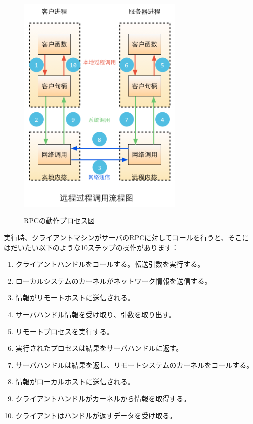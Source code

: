 \begin{figure}[H]
   \includegraphics[width=8cm]{8.4.rpc.png}
   \label{図8.8}
   \caption{RPCの動作プロセス図}
\end{figure}

実行時、クライアントマシンがサーバのRPCに対してコールを行うと、そこにはだいたい以下のような10ステップの操作があります：

\begin{enumerate}
  \item クライアントハンドルをコールする。転送引数を実行する。
  \item ローカルシステムのカーネルがネットワーク情報を送信する。
  \item 情報がリモートホストに送信される。
  \item サーバハンドル情報を受け取り、引数を取り出す。
  \item リモートプロセスを実行する。
  \item 実行されたプロセスは結果をサーバハンドルに返す。
  \item サーバハンドルは結果を返し、リモートシステムのカーネルをコールする。
  \item 情報がローカルホストに送信される。
  \item クライアントハンドルがカーネルから情報を取得する。
  \item クライアントはハンドルが返すデータを受け取る。
\end{enumerate}



